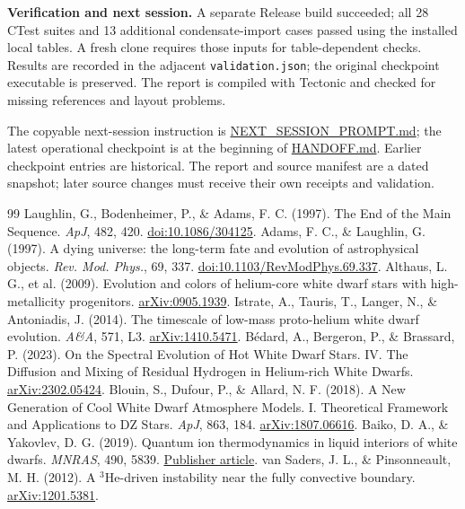 \documentclass[11pt,letterpaper]{article}
\newcommand{\doc}[2]{\href{https://github.com/oklo/ember/blob/master/#1}{#2}}
\begin{document}
\textbf{Verification and next session.} A separate Release build succeeded;
all 28 CTest suites and 13 additional condensate-import cases passed using the
installed local tables. A fresh clone requires those inputs for table-dependent
checks. Results
are recorded in the adjacent \texttt{validation.json}; the original checkpoint
executable is preserved. The report is compiled with Tectonic and checked
for missing references and layout problems.

The copyable next-session instruction
is \doc{docs/NEXT_SESSION_PROMPT.md}{NEXT\_SESSION\_PROMPT.md}; the latest operational
checkpoint is at the beginning of \doc{HANDOFF.md}{HANDOFF.md}. Earlier checkpoint
entries are historical. The report and source manifest are a dated snapshot;
later source changes must receive their own receipts and validation.

\clearpage
\begin{thebibliography}{99}
\small
{} Laughlin, G., Bodenheimer, P., \& Adams, F. C. (1997).
The End of the Main Sequence. \emph{ApJ}, 482, 420.
\href{https://doi.org/10.1086/304125}{doi:10.1086/304125}.
 Adams, F. C., \& Laughlin, G. (1997).
A dying universe: the long-term fate and evolution of astrophysical objects.
\emph{Rev. Mod. Phys.}, 69, 337.
\href{https://doi.org/10.1103/RevModPhys.69.337}{doi:10.1103/RevModPhys.69.337}.
 Althaus, L. G., et al. (2009).
Evolution and colors of helium-core white dwarf stars with high-metallicity
progenitors. \href{https://arxiv.org/abs/0905.1939}{arXiv:0905.1939}.
 Istrate, A., Tauris, T., Langer, N., \& Antoniadis, J. (2014).
The timescale of low-mass proto-helium white dwarf evolution.
\emph{A\&A}, 571, L3. \href{https://arxiv.org/abs/1410.5471}{arXiv:1410.5471}.
 B\'edard, A., Bergeron, P., \& Brassard, P. (2023).
On the Spectral Evolution of Hot White Dwarf Stars. IV. The Diffusion and Mixing
of Residual Hydrogen in Helium-rich White Dwarfs.
\href{https://arxiv.org/abs/2302.05424}{arXiv:2302.05424}.
 Blouin, S., Dufour, P., \& Allard, N. F. (2018).
A New Generation of Cool White Dwarf Atmosphere Models. I. Theoretical Framework
and Applications to DZ Stars. \emph{ApJ}, 863, 184.
\href{https://arxiv.org/abs/1807.06616}{arXiv:1807.06616}.
 Baiko, D. A., \& Yakovlev, D. G. (2019).
Quantum ion thermodynamics in liquid interiors of white dwarfs.
\emph{MNRAS}, 490, 5839.
\href{https://academic.oup.com/mnras/article/490/4/5839/5610243}{Publisher article}.
 van Saders, J. L., \& Pinsonneault, M. H. (2012).
A $^3$He-driven instability near the fully convective boundary.
\href{https://arxiv.org/abs/1201.5381}{arXiv:1201.5381}.
\end{thebibliography}
\end{document}
